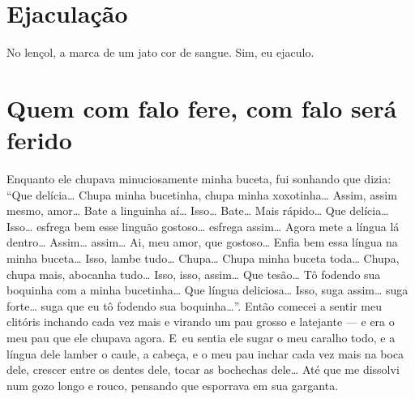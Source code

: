 \chapter{Ejaculação}

No lençol, a marca de um jato cor de sangue. Sim, eu ejaculo.

\chapter{Quem com falo fere, com falo será ferido}

Enquanto ele chupava minuciosamente minha buceta, fui sonhando que
dizia: ``Que delícia… Chupa minha bucetinha, chupa minha
xoxotinha… Assim, assim mesmo, amor… Bate a linguinha
aí… Isso… Bate… Mais rápido… Que
delícia… Isso… esfrega bem esse linguão gostoso…
esfrega assim… Agora mete a língua lá dentro…
Assim… assim… Ai, meu amor, que gostoso… Enfia bem
essa língua na minha buceta… Isso, lambe tudo…
Chupa… Chupa minha buceta toda… Chupa, chupa mais,
abocanha tudo… Isso, isso, assim… Que tesão… Tô
fodendo sua boquinha com a minha bucetinha… Que língua
deliciosa… Isso, suga assim… suga forte… suga que
eu tô fodendo sua boquinha…''. Então comecei a sentir meu
clitóris inchando cada vez mais e virando um pau grosso e latejante ---
e era o meu pau que ele chupava agora. E~eu sentia ele sugar o meu
caralho todo, e a língua dele lamber o caule, a cabeça, e o meu pau
inchar cada vez mais na boca dele, crescer entre os dentes dele, tocar
as bochechas dele… Até que me dissolvi num gozo longo e rouco,
pensando que esporrava em sua garganta.

